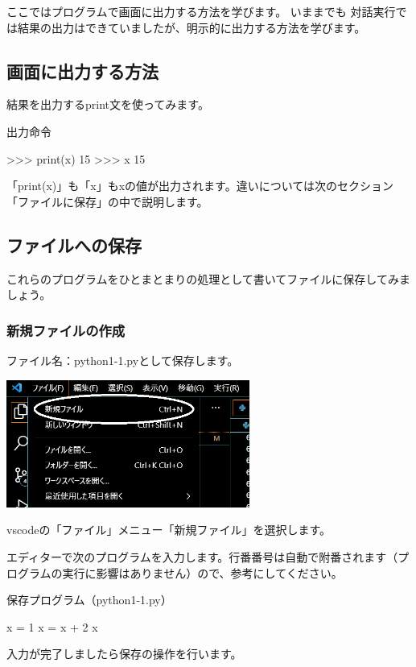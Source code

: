 \documentclass[11pt,a4paper,dvipdfmx,titlepage]{jsreport}
\begin{document}
ここではプログラムで画面に出力する方法を学びます。
いままでも {\gt 対話実行}では結果の出力はできていましたが、明示的に出力する方法を学びます。


\subsection{画面に出力する方法}
結果を出力するprint文を使ってみます。
\begin{grabox}{出力命令}
\begin{listingcont}
>>> print(x)
15
>>> x
15
\end{listingcont}
\end{grabox}
「print(x)」も「x」もxの値が出力されます。違いについては次のセクション「ファイルに保存」の中で説明します。


\subsection{ファイルへの保存}
これらのプログラムをひとまとまりの処理として書いてファイルに保存してみましょう。

\subsubsection{新規ファイルの作成}

ファイル名：python1-1.pyとして保存します。

\includegraphics[width=8cm]{images/image5.png}


vscodeの「ファイル」メニュー「新規ファイル」を選択します。

エディターで次のプログラムを入力します。行番番号は自動で附番されます（プログラムの実行に影響はありません）ので、参考にしてください。

\begin{grabox}{保存プログラム（python1-1.py）}
\begin{listing}{1}
x = 1
x = x + 2
x
\end{listing}
\end{grabox}
入力が完了しましたら保存の操作を行います。
\end{document}
